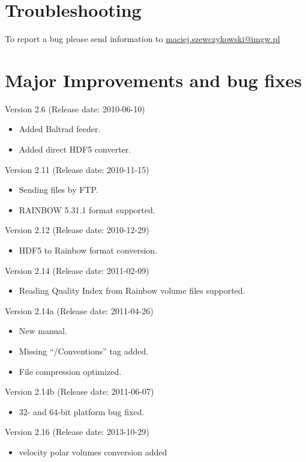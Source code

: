 \documentclass[11p]{article}
\begin{document}
\section{Troubleshooting}

To report a bug please send information to
\href{mailto:lukasz.wojtas@imgw.pl}{maciej.szewczykowski@imgw.pl}

\section{Major Improvements and bug fixes}
 
Version 2.6 (Release date: 2010-06-10)
\begin{itemize}
    \item Added Baltrad feeder.
    \item Added direct HDF5 converter.
\end{itemize}
Version 2.11 (Release date: 2010-11-15)
\begin{itemize}
    \item Sending files by FTP.
    \item RAINBOW 5.31.1 format supported.
\end{itemize}
Version 2.12 (Release date: 2010-12-29)
\begin{itemize}
    \item HDF5 to Rainbow format conversion.
\end{itemize}
Version 2.14 (Release date: 2011-02-09)
\begin{itemize}
    \item Reading Quality Index from Rainbow volume files supported.
\end{itemize}
Version 2.14a (Release date: 2011-04-26)
\begin{itemize}
    \item New manual.
    \item Missing ``/Conventions'' tag added.
    \item File compression optimized.
\end{itemize}
Version 2.14b (Release date: 2011-06-07)
\begin{itemize}
    \item 32- and 64-bit platform bug fixed.
\end{itemize}
Version 2.16 (Release date: 2013-10-29)
\begin{itemize}
    \item velocity polar volumes conversion added
\end{itemize}
\end{document}
